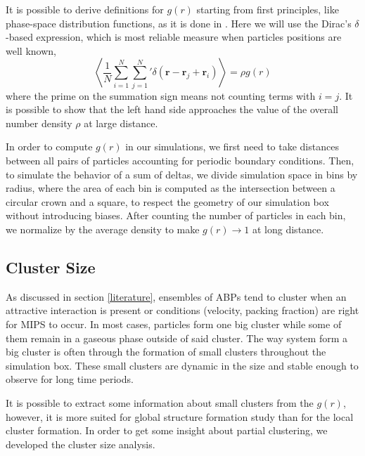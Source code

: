 \documentclass[../../master_thesis_np.tex]{subfiles}
\begin{document}
		It is possible to derive definitions for $g(r)$ starting from first principles, like phase-space distribution functions, as it is done in \cite{hansen90a}. 
		Here we will use the Dirac's $\delta$-based expression, which is most reliable measure when particles positions are well known,
		\begin{equation}
			\left\langle \frac{1}{N} \sum_{i=1}^{N} \sum_{j=1}^{N}{}' \delta (\mathbf{r} - \mathbf{r}_j + \mathbf{r}_i) \right\rangle = \rho g(r)
		\end{equation}
		where the prime on the summation sign means not counting terms with $i = j$. 
		It is possible to show that the left hand side approaches the value of the overall number density $\rho$ at large distance.
		
		In order to compute $g(r)$ in our simulations, we first need to take distances between all pairs of particles accounting for periodic boundary conditions.
		Then, to simulate the behavior of a sum of deltas, we divide simulation space in bins by radius, where the area of each bin is computed as the intersection between a circular crown and a square, to respect the geometry of our simulation box without introducing biases.
		After counting the number of particles in each bin, we normalize by the average density to make $g(r) \to 1$ at long distance.
		
		\subsection{Cluster Size}
		As discussed in section \ref{literature}, ensembles of ABPs tend to cluster when an attractive interaction is present or conditions (velocity, packing fraction) are right for MIPS to occur. 
		In most cases, particles form one big cluster while some of them remain in a gaseous phase outside of said cluster. 
		The way system form a big cluster is often through the formation of small clusters throughout the simulation box. These small clusters are dynamic in the size and stable enough to observe for long time periods.
		
		It is possible to extract some information about small clusters from the $g(r)$, however, it is more suited for global structure formation study than for the local cluster formation.
		In order to get some insight about partial clustering, we developed the cluster size analysis. 
		
\end{document}
